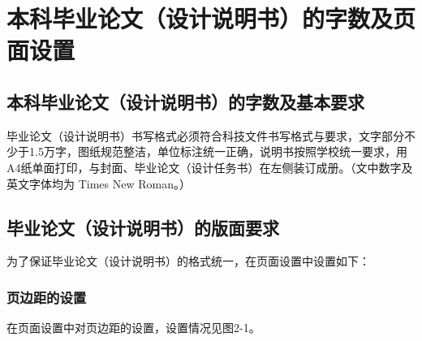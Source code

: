 \chapter{本科毕业论文（设计说明书）的字数及页面设置} 

\section{本科毕业论文（设计说明书）的字数及基本要求}

毕业论文（设计说明书）书写格式必须符合科技文件书写格式与要求，文字部分不少于1.5万字，图纸规范整洁，单位标注统一正确，说明书按照学校统一要求，用A4纸单面打印，与封面、毕业论文（设计任务书）在左侧装订成册。（文中数字及英文字体均为 Times New Roman。）

\section{毕业论文（设计说明书）的版面要求}

为了保证毕业论文（设计说明书）的格式统一，在页面设置中设置如下：

\subsection{页边距的设置}

在页面设置中对页边距的设置，设置情况见图2-1。